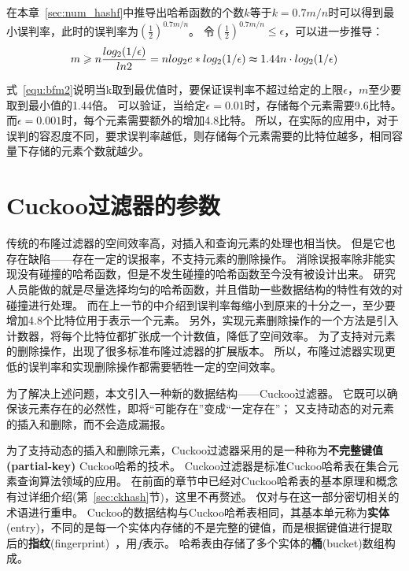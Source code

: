 在本章~\ref{sec:num_hashf}中推导出哈希函数的个数$k$等于$k = 0.7{m/n}$时可以得到最小误判率，此时的误判率为$(\frac{1}{2})^{0.7{m/n}}$。
令$(\frac{1}{2})^{0.7{m/n}} \leq \epsilon $，可以进一步推导：
\begin{equation}
m \geq n\frac{log_2({1/\epsilon})}{ln2} = nlog_2e\ast log_2({1/\epsilon}) \thickapprox 1.44n\cdot log_2({1/\epsilon})
\label{equ:bfm2}
\end{equation}

式~\ref{equ:bfm2}说明当k取到最优值时，要保证误判率不超过给定的上限$\epsilon$，$m$至少要取到最小值的1.44倍。
可以验证，当给定$\epsilon = 0.01$时，存储每个元素需要9.6比特。
而$\epsilon = 0.001 $时，每个元素需要额外的增加4.8比特。
所以，在实际的应用中，对于误判的容忍度不同，要求误判率越低，则存储每个元素需要的比特位越多，相同容量下存储的元素个数就越少。

\section{Cuckoo过滤器的参数}
\label{sec:cbf_para}
传统的布隆过滤器的空间效率高，对插入和查询元素的处理也相当快。
但是它也存在缺陷——存在一定的误报率，不支持元素的删除操作。
消除误报率除非能实现没有碰撞的哈希函数，但是不发生碰撞的哈希函数至今没有被设计出来。
研究人员能做的就是尽量选择均匀的哈希函数，并且借助一些数据结构的特性有效的对碰撞进行处理。
而在上一节的中介绍到误判率每缩小到原来的十分之一，至少要增加4.8个比特位用于表示一个元素。
另外，实现元素删除操作的一个方法是引入计数器，将每个比特位都扩张成一个计数值，降低了空间效率。
为了支持对元素的删除操作，出现了很多标准布隆过滤器的扩展版本\cite{bender2012don,bonomi2006improved,fan2000summary}。
所以，布隆过滤器实现更低的误判率和实现删除操作都需要牺牲一定的空间效率。

为了解决上述问题，本文引入一种新的数据结构——Cuckoo过滤器。
它既可以确保该元素存在的必然性，即将“可能存在”变成“一定存在”；
又支持动态的对元素的插入和删除，而不会造成漏报。

为了支持动态的插入和删除元素，Cuckoo过滤器采用的是一种称为\textbf{不完整键值(partial-key)} Cuckoo哈希的技术。
Cuckoo过滤器是标准Cuckoo哈希表在集合元素查询算法领域的应用。
在前面的章节中已经对Cuckoo哈希表的基本原理和概念有过详细介绍(第~\ref{sec:ckhash}节)，这里不再赘述。
仅对与在这一部分密切相关的术语进行重申。
Cuckoo的数据结构与Cuckoo哈希表相同，其基本单元称为\textbf{实体}(entry)，不同的是每一个实体内存储的不是完整的键值，而是根据键值进行提取后的\textbf{指纹}(fingerprint)~\cite{memc3}，用$f$表示。
哈希表由存储了多个实体的\textbf{桶}(bucket)数组构成。

